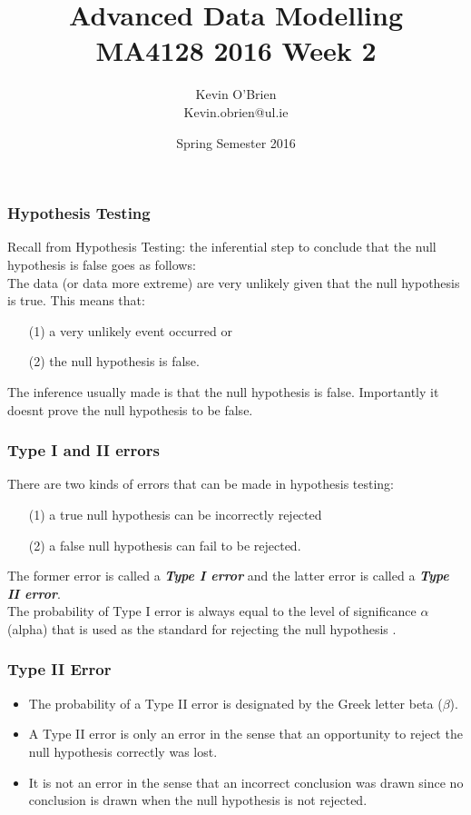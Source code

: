 \documentclass[a4]{beamer}
\title[MA4128]{Advanced Data Modelling \\ {\normalsize MA4128 2016 Week 2}}
\author[Kevin O'Brien]{Kevin O'Brien \\ {\scriptsize Kevin.obrien@ul.ie}}
\date{Spring Semester 2016}
\institute[Maths \& Stats]{Dept. of Mathematics \& Statistics, \\ University \textit{of} Limerick}
\begin{document}
\begin{frame}
\titlepage
\end{frame}

\begin{frame}
	\frametitle{Hypothesis Testing}
	\large
	Recall from Hypothesis Testing: the inferential step to conclude that the null hypothesis is false goes as follows:\\  The data (or data more extreme) are very unlikely given that the null hypothesis is true.
	\bigskip
	This means that:
	\begin{itemize}\item [(1)] a very unlikely event occurred or
		\item[(2)] the null hypothesis is false. \end{itemize} \smallskip
	The inference usually made is that the null hypothesis is false. Importantly it doesnt prove the null hypothesis to be false.
\end{frame}
\begin{frame}
	\frametitle{Type I and II errors}
	\large
	There are two kinds of errors that can be made in hypothesis testing:
	\begin{itemize}
		\item[(1)] a true null hypothesis can be incorrectly rejected
		\item[(2)] a false null hypothesis can fail to be rejected.
	\end{itemize}\smallskip
	The former error is called a \textbf{\emph{Type I error}} and the latter error is called a \textbf{\emph{Type II error}}. \\ \bigskip
	The probability of Type I error is always equal to the level of significance $\alpha$ (alpha) that is used as the standard for rejecting the null hypothesis .
\end{frame}
\begin{frame}
	\frametitle{Type II Error}
	\large
	\begin{itemize}
		
		\item The probability of a Type II error is designated by the Greek letter beta ($\beta$). \smallskip
		\item A Type II error is only an error in the sense that an opportunity to reject the null hypothesis correctly was lost. \smallskip
		\item It is not an error in the sense that an incorrect conclusion was drawn since no conclusion is drawn when the null hypothesis is not rejected.
	\end{itemize}
\end{frame}
\end{document}
